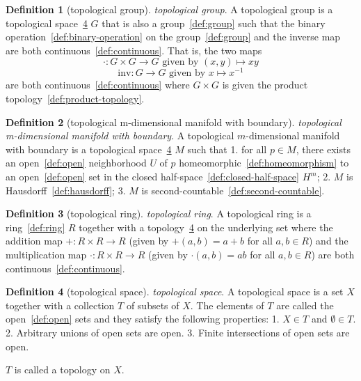 \documentclass[12pt,a4paper]{article}
\theoremstyle{definition}
\newtheorem{definition}{Definition}
\begin{document}
\begin{definition}[topological group]\label{def:topological-group}
\emph{topological group}. A topological group is a topological space~\ref{def:topological-space} $G$ that is also a group~\ref{def:group} such that the binary operation~\ref{def:binary-operation} on the group~\ref{def:group} and the inverse map are both continuous~\ref{def:continuous}. That is, the two maps $$\cdot:G\times G\to G \text{ given by } (x,y)\mapsto xy$$$$\text{inv}:G\to G \text{ given by } x\mapsto x^{-1}$$ are both continuous~\ref{def:continuous} where $G\times G$ is given the product topology~\ref{def:product-topology}.
\end{definition}

\begin{definition}[topological m-dimensional manifold with boundary]\label{def:topological-m-dimensional-manifold-with-boundary}
\emph{topological m-dimensional manifold with boundary}. A topological $m$-dimensional manifold with boundary is a topological space~\ref{def:topological-space} $M$ such that 
1. for all $p \in M$, there exists an open~\ref{def:open} neighborhood $U$ of $p$ homeomorphic~\ref{def:homeomorphism} to an open~\ref{def:open} set in the closed half-space~\ref{def:closed-half-space} $H^m$; 
2. $M$ is Hausdorff~\ref{def:hausdorff};
3. $M$ is second-countable~\ref{def:second-countable}.
\end{definition}

\begin{definition}[topological ring]\label{def:topological-ring}
\emph{topological ring}. A topological ring is a ring~\ref{def:ring} $R$ together with a topology~\ref{def:topological-space} on the underlying set where the addition map $+:R\times R\to R$ (given by $+(a,b) = a+b$ for all $a,b\in R$) and the multiplication map $\cdot:R\times R\to R$ (given by $\cdot(a,b)= ab$ for all $a,b\in R$) are both continuous~\ref{def:continuous}.
\end{definition}

\begin{definition}[topological space]\label{def:topological-space}
\emph{topological space}. A topological space is a set $X$ together with a collection $T$ of subsets of $X$. The elements of $T$ are called the open~\ref{def:open} sets and they satisfy the following properties:
1. $X\in T$ and $\emptyset \in T$.
2. Arbitrary unions of open sets are open.
3. Finite intersections of open sets are open.

$T$ is called a topology on $X$.
\end{definition}
\end{document}
